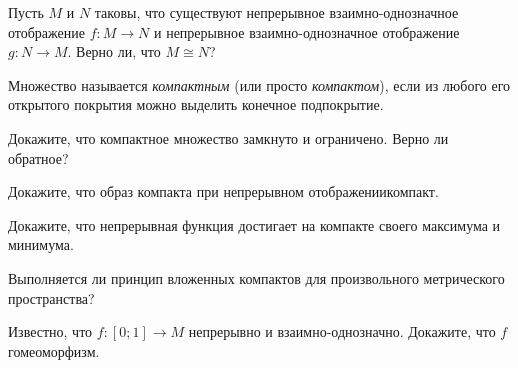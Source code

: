 \documentclass[a4paper,12pt]{article}
\begin{document}
Пусть $M$ и $N$ таковы, что существуют непрерывное взаимно-однозначное отображение $f \colon M \to N$ и непрерывное взаимно-однозначное отображение $g \colon N \to M$. Верно ли, что $M \cong N$?

Множество называется \emph{компактным} (или просто \emph{компактом}), если из любого его открытого покрытия можно выделить конечное подпокрытие.

Докажите, что компактное множество замкнуто и ограничено. Верно ли обратное?

Докажите, что образ компакта при непрерывном отображении\т компакт.

Докажите, что непрерывная функция достигает на компакте своего максимума и минимума.

Выполняется ли принцип вложенных компактов для произвольного метрического пространства?

Известно, что $f \colon [0;1] \to M$ непрерывно и взаимно-однозначно. Докажите, что $f$\т гомеоморфизм.


{}
\end{document}
